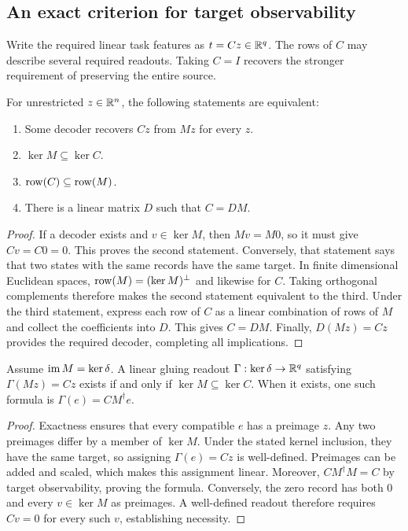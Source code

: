 \subsection{An exact criterion for target observability}
\label{atl:observability}

Write the required linear task features as $t=Cz\in\mathbb R^q$. The rows of $C$
may describe several required readouts. Taking $C=I$ recovers the stronger
requirement of preserving the entire source.

\begin{theorem}
\label{atl:observability-theorem}
For unrestricted $z\in\mathbb R^n$, the following statements are equivalent:
\begin{enumerate}
  \item Some decoder recovers $Cz$ from $Mz$ for every $z$.
  \item $\ker M\subseteq\ker C$.
  \item $\operatorname{row}(C)\subseteq\operatorname{row}(M)$.
  \item There is a linear matrix $D$ such that $C=DM$.
\end{enumerate}
\end{theorem}

\begin{proof}
If a decoder exists and $v\in\ker M$, then $Mv=M0$, so it must give
$Cv=C0=0$. This proves the second statement. Conversely, that statement says
that two states with the same records have the same target. In finite
dimensional Euclidean spaces, $\operatorname{row}(M)=(\ker M)^\perp$ and likewise for $C$.
Taking orthogonal complements therefore makes the second statement equivalent
to the third. Under the third statement, express each row of $C$ as a linear
combination of rows of $M$ and collect the coefficients into $D$. This gives
$C=DM$. Finally, $D(Mz)=Cz$ provides the required decoder, completing all
implications.
\end{proof}

\begin{corollary}
\label{atl:gluing-corollary}
Assume $\operatorname{im} M=\ker\delta$. A linear gluing readout
$\Gamma:\ker\delta\to\mathbb R^q$ satisfying $\Gamma(Mz)=Cz$ exists if and only
if $\ker M\subseteq\ker C$. When it exists, one such formula is
$\Gamma(e)=CM^\dagger e$.
\end{corollary}

\begin{proof}
Exactness ensures that every compatible $e$ has a preimage $z$. Any two
preimages differ by a member of $\ker M$. Under the stated kernel inclusion,
they have the same target, so assigning $\Gamma(e)=Cz$ is well-defined.
Preimages can be added and scaled, which makes this assignment linear.
Moreover, $CM^\dagger M=C$ by target observability, proving the formula.
Conversely, the zero record has both $0$ and every $v\in\ker M$ as
preimages. A well-defined readout therefore requires $Cv=0$ for every such
$v$, establishing necessity.
\end{proof}

